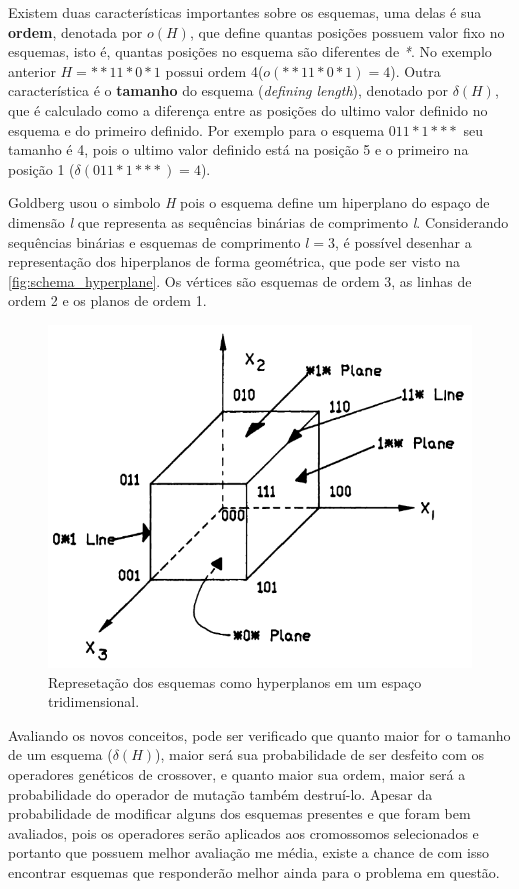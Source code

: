 Existem duas características importantes sobre os esquemas, uma delas é sua \textbf{ordem}, denotada por \(o(H)\), que define quantas posições possuem valor fixo no esquemas, isto é, quantas posições no esquema são diferentes de \textit{*}. No exemplo anterior \(H=**11*0*1\) possui ordem 4(\(o(**11*0*1) = 4\)). Outra característica é o \textbf{tamanho} do esquema (\textit{defining length}), denotado por \(\delta(H)\), que é calculado como a diferença entre as posições do ultimo valor definido no esquema e do primeiro definido. Por exemplo para o esquema \(011*1***\) seu tamanho é 4, pois o ultimo valor definido está na posição 5 e o primeiro na posição 1 (\(\delta(011*1***) = 4\)). 

Goldberg usou o simbolo \textit{H} pois o esquema define um hiperplano do espaço de dimensão \textit{l} que representa as sequências binárias de comprimento \textit{l}. Considerando sequências binárias e esquemas de comprimento \(l=3\), é possível desenhar a representação dos hiperplanos de forma geométrica, que pode ser visto na \autoref{fig:schema_hyperplane}. Os vértices são esquemas de ordem 3, as linhas de ordem 2 e os planos de ordem 1.

\begin{figure}[ht]
	\centering
	\includegraphics[width=0.75\linewidth]{imagens/schema_hyperplane.png}
	\caption{Represetação dos esquemas como hyperplanos em um espaço tridimensional. \cite{Goldberg1989}}
	\label{fig:schema_hyperplane}
\end{figure}

Avaliando os novos conceitos, pode ser verificado que quanto maior for o tamanho de um esquema (\(\delta(H)\)), maior será sua probabilidade de ser desfeito com os operadores genéticos de crossover, e quanto maior sua ordem, maior será a probabilidade do operador de mutação também destruí-lo. Apesar da probabilidade de modificar alguns dos esquemas presentes e que foram bem avaliados, pois os operadores serão aplicados aos cromossomos selecionados e portanto que possuem melhor avaliação me média, existe a chance de com isso encontrar esquemas que responderão melhor ainda para o problema em questão. 

